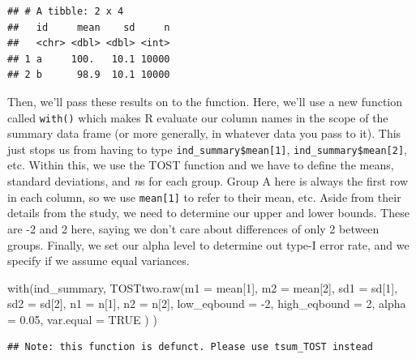 \documentclass[
]{book}
\newenvironment{Shaded}{\begin{snugshade}}{\end{snugshade}}
\newcommand{\AttributeTok}[1]{\textcolor[rgb]{0.77,0.63,0.00}{#1}}
\newcommand{\ConstantTok}[1]{\textcolor[rgb]{0.00,0.00,0.00}{#1}}
\newcommand{\DecValTok}[1]{\textcolor[rgb]{0.00,0.00,0.81}{#1}}
\newcommand{\FloatTok}[1]{\textcolor[rgb]{0.00,0.00,0.81}{#1}}
\newcommand{\FunctionTok}[1]{\textcolor[rgb]{0.00,0.00,0.00}{#1}}
\newcommand{\NormalTok}[1]{#1}
\newcommand{\SpecialCharTok}[1]{\textcolor[rgb]{0.00,0.00,0.00}{#1}}
\begin{document}
\begin{verbatim}
## # A tibble: 2 x 4
##   id     mean    sd     n
##   <chr> <dbl> <dbl> <int>
## 1 a     100.   10.1 10000
## 2 b      98.9  10.1 10000
\end{verbatim}

Then, we'll pass these results on to the function. Here, we'll use a new function called \texttt{with()} which makes R evaluate our column names in the scope of the summary data frame (or more generally, in whatever data you pass to it). This just stops us from having to type \texttt{ind\_summary\$mean{[}1{]}}, \texttt{ind\_summary\$mean{[}2{]}}, etc. Within this, we use the TOST function and we have to define the means, standard deviations, and \emph{n}s for each group. Group A here is always the first row in each column, so we use \texttt{mean{[}1{]}} to refer to their mean, etc. Aside from their details from the study, we need to determine our upper and lower bounds. These are -2 and 2 here, saying we don't care about differences of only 2 between groups. Finally, we set our alpha level to determine out type-I error rate, and we specify if we assume equal variances.

\begin{Shaded}
\begin{Highlighting}[]
\FunctionTok{with}\NormalTok{(ind\_summary, }
     \FunctionTok{TOSTtwo.raw}\NormalTok{(}\AttributeTok{m1 =}\NormalTok{ mean[}\DecValTok{1}\NormalTok{],}
                 \AttributeTok{m2 =}\NormalTok{ mean[}\DecValTok{2}\NormalTok{],}
                 \AttributeTok{sd1 =}\NormalTok{ sd[}\DecValTok{1}\NormalTok{],}
                 \AttributeTok{sd2 =}\NormalTok{ sd[}\DecValTok{2}\NormalTok{],}
                 \AttributeTok{n1 =}\NormalTok{ n[}\DecValTok{1}\NormalTok{],}
                 \AttributeTok{n2 =}\NormalTok{ n[}\DecValTok{2}\NormalTok{],}
                 \AttributeTok{low\_eqbound =} \SpecialCharTok{{-}}\DecValTok{2}\NormalTok{,}
                 \AttributeTok{high\_eqbound =} \DecValTok{2}\NormalTok{, }
                 \AttributeTok{alpha =} \FloatTok{0.05}\NormalTok{, }
                 \AttributeTok{var.equal =} \ConstantTok{TRUE}
\NormalTok{                 )}
\NormalTok{     )}
\end{Highlighting}
\end{Shaded}

\begin{verbatim}
## Note: this function is defunct. Please use tsum_TOST instead
\end{verbatim}
\end{document}
